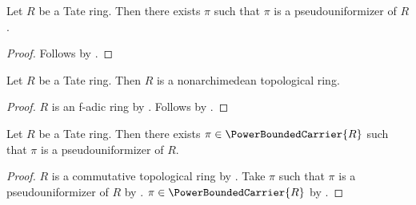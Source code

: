 \begin{proposition}\label{tate_ring_has_pseudouniformizer}
    Let $R$ be a Tate ring.
    Then there exists $\pi$ such that
        $\pi$ is a pseudouniformizer of $R$.
\end{proposition}
\begin{proof}
    Follows by .
\end{proof}

\begin{classification}\label{tate_ring_is_nonarchimedean}
    Let $R$ be a Tate ring.
    Then $R$ is a nonarchimedean topological ring.
\end{classification}
\begin{proof}
    $R$ is an f-adic ring by .
    Follows by .
\end{proof}

\begin{theorem}\label{tate_ring_has_power_bounded_pseudouniformizer}
    Let $R$ be a Tate ring.
    Then there exists $\pi\in\PowerBoundedCarrier{R}$ such that
        $\pi$ is a pseudouniformizer of $R$.
\end{theorem}
\begin{proof}
    $R$ is a commutative topological ring by
        .
    Take $\pi$ such that $\pi$ is a pseudouniformizer of $R$ by
        .
    $\pi\in\PowerBoundedCarrier{R}$ by
        .
\end{proof}

